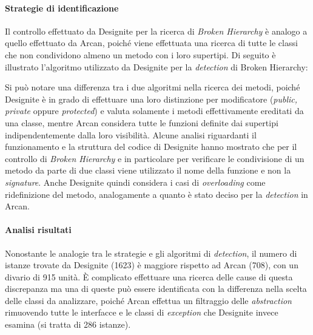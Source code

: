     \paragraph{Strategie di identificazione}
        Il controllo effettuato da Designite per la ricerca di \textit{Broken Hierarchy} è analogo a quello effettuato da Arcan, poiché viene effettuata una ricerca di tutte le classi che non condividono almeno un metodo con i loro supertipi. Di seguito è illustrato l'algoritmo utilizzato da Designite per la \textit{detection} di Broken Hierarchy:
        \begin{algorithmic}
                        \EndIf
                    \EndFor
                \EndIf
            \EndFunction
        \end{algorithmic}
        Si può notare una differenza tra i due algoritmi nella ricerca dei metodi, poiché Designite è in grado di effettuare una loro distinzione per modificatore (\textit{public, private} oppure \textit{protected}) e valuta solamente i metodi effettivamente ereditati da una classe, mentre Arcan considera tutte le funzioni definite dai supertipi indipendentemente dalla loro visibilità.
        Alcune analisi riguardanti il funzionamento e la struttura del codice di Designite hanno mostrato che per il controllo di \textit{Broken Hierarchy} e in particolare per verificare le condivisione di un metodo da parte di due classi viene utilizzato il nome della funzione e non la \textit{signature}. Anche Designite quindi considera i casi di \textit{overloading} come ridefinizione del metodo, analogamente a quanto è stato deciso per la \textit{detection} in Arcan.
        
    \paragraph{Analisi risultati}
        Nonostante le analogie tra le strategie e gli algoritmi di \textit{detection}, il numero di istanze trovate da Designite (1623) è maggiore rispetto ad Arcan (708), con un divario di 915 unità. È complicato effettuare una ricerca delle cause di questa discrepanza ma una di queste può essere identificata con la differenza nella scelta delle classi da analizzare, poiché Arcan effettua un filtraggio delle \textit{abstraction} rimuovendo tutte le interfacce e le classi di \textit{exception} che Designite invece esamina (si tratta di 286 istanze). 
        
